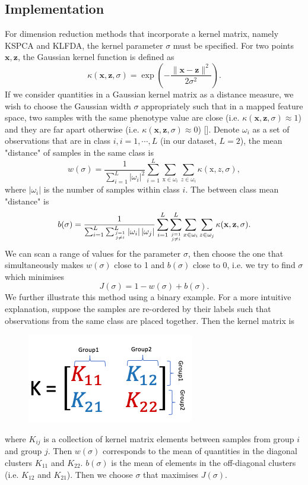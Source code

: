 \documentclass[a4paper,12pt]{article}
\begin{document}
\subsection{Implementation} \label{Implementation}
For dimension reduction methods that incorporate a kernel matrix, namely KSPCA and KLFDA, the kernel parameter $\sigma$ must be specified. For two points $\mathbf{x}, \mathbf{z}$, the Gaussian kernel function is defined as $$\kappa(\mathbf{x}, \mathbf{z}, \sigma)=\exp \left(-\frac{\|\mathbf{x}-\mathbf{z}\|^{2}}{2 \sigma^{2}}\right).$$ If we consider quantities in a Gaussian kernel matrix as a distance measure, we wish to choose the Gaussian width $\sigma$ appropriately such that in a mapped feature space, two samples with the same phenotype value are close (i.e. $\kappa(\mathbf{x}, \mathbf{z}, \sigma) \approx 1$) and they are far apart otherwise (i.e. $\kappa(\mathbf{x}, \mathbf{z}, \sigma) \approx 0$) [\cite{li2010automatic}]. Denote $\omega_{i}$ as a set of observations that are in class $i, i = 1,\cdots,L$ (in our dataset, $L = 2$), the mean "distance" of samples in the same class is $$w(\sigma)=\frac{1}{\sum_{i=1}^{L}\left|\omega_{i}\right|^{2}} \sum_{i=1}^{L} \sum_{\mathrm{x} \in \omega_{i}} \sum_{z \in \omega_{i}} \kappa(\mathrm{x}, z, \sigma),$$ where $\left|\omega_{i}\right|$ is the number of samples within class $i$. The between class mean "distance" is $$b(\sigma)=\frac{1}{\sum_{i=1}^{L} \sum_{j=1 \atop j \neq i}^{L}\left|\omega_{i}\right|\left|\omega_{j}\right|} \sum_{i=1}^{L} \sum_{j=1 \atop j \neq i}^{L} \sum_{x \in \omega_{i}} \sum_{z \in \omega_{j}} \kappa(\mathbf{x}, \mathbf{z}, \sigma).$$ We can scan a range of values for the parameter $\sigma$, then choose the one that simultaneously makes $w(\sigma)$ close to 1 and $b(\sigma)$ close to 0, i.e. we try to find $\sigma$ which minimises $$J(\sigma) = 1 - w(\sigma) + b(\sigma).$$ We further illustrate this method using a binary example. For a more intuitive explanation, suppose the samples are re-ordered by their labels such that observations from the same class are placed together. Then the kernel matrix is 
    \begin{figure}[H]
    \centering
    \includegraphics{kernel.png}
    \end{figure}
 where $K_{ij}$ is a collection of kernel matrix elements between samples from group $i$ and group $j$. Then $w(\sigma)$ corresponds to the mean of quantities in the diagonal clusters $K_{11}$ and $K_{22}$. $b(\sigma)$ is the mean of elements in the off-diagonal clusters (i.e. $K_{12}$ and $K_{21}$). Then we choose $\sigma$ that maximises $J(\sigma)$. 
\end{document}
